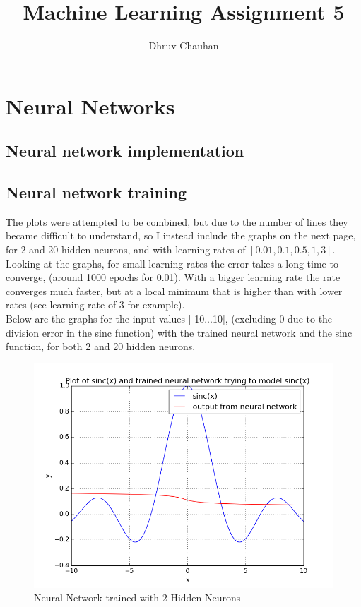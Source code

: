 \documentclass{article}
\begin{document}
\title{Machine Learning Assignment 5}
\author{Dhruv Chauhan}
\maketitle

\section{Neural Networks}
\subsection{Neural network implementation}

\newpage
\subsection{Neural network training}

The plots were attempted to be combined, but due to the number of lines they became difficult to understand, so I instead include the graphs on the next page, for 2 and 20 hidden neurons, and with learning rates of $[0.01, 0.1, 0.5, 1, 3]$. \\

Looking at the graphs, for small learning rates the error takes a long time to converge, (around 1000 epochs for 0.01). With a bigger learning rate the rate converges much faster, but at a local minimum that is higher than with lower rates (see learning rate of 3 for example).\\



\newpage
Below are the graphs for the input values [-10...10], (excluding 0 due to the division error in the sinc function) with the trained neural network and the sinc function, for both 2 and 20 hidden neurons.

\begin{figure}[h]
\includegraphics[width=16cm]{figs/nn2.png}
\caption{Neural Network trained with 2 Hidden Neurons}
\label{fig:nn2}
\end{figure}
\end{document}
